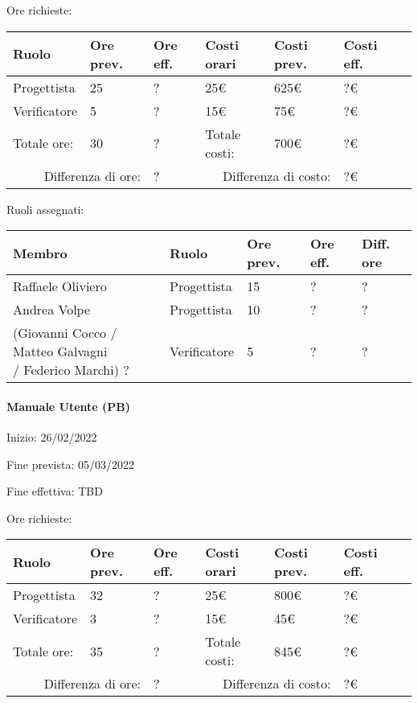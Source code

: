 \documentclass[a4paper, 12pt]{article}
\begin{document}
Ore richieste:\\[0.5em]
\begin{tabular}{|l|l|l||l|l|l|l|}\hline
Ruolo & Ore prev. & Ore eff. & Costi orari & Costi prev. & Costi eff.\\\hline
Progettista & 25 & ? & 25\euro & 625\euro & ?\euro \\\hline
Verificatore & 5 & ? & 15\euro & 75\euro & ?\euro \\\hline
Totale ore: & 30 & ? & Totale costi: & 700\euro & ?\euro \\\hline
\multicolumn{2}{|r|}{Differenza di ore:} & ? & \multicolumn{2}{r|}{Differenza di costo:} & ?\euro \\\hline
\end{tabular}

Ruoli assegnati:\\[0.5em]
\begin{tabular}{|l|l|l|l|l|}\hline
Membro & Ruolo & Ore prev. & Ore eff. & Diff. ore \\\hline
Raffaele Oliviero & Progettista & 15 & ? & ? \\\hline
Andrea Volpe & Progettista & 10 & ? & ? \\\hline
\pbox{20cm}{(Giovanni Cocco / Matteo Galvagni\\ / Federico Marchi) ?} & Verificatore & 5 & ? & ? \\\hline
\end{tabular}

\paragraph{Manuale Utente (PB)}
Inizio: 26/02/2022\par
Fine prevista: 05/03/2022\par
Fine effettiva: TBD

Ore richieste:\\[0.5em]
\begin{tabular}{|l|l|l||l|l|l|l|}\hline
Ruolo & Ore prev. & Ore eff. & Costi orari & Costi prev. & Costi eff.\\\hline
Progettista & 32 & ? & 25\euro & 800\euro & ?\euro \\\hline
Verificatore & 3 & ? & 15\euro & 45\euro & ?\euro \\\hline
Totale ore: & 35 & ? & Totale costi: & 845\euro & ?\euro \\\hline
\multicolumn{2}{|r|}{Differenza di ore:} & ? & \multicolumn{2}{r|}{Differenza di costo:} & ?\euro \\\hline
\end{tabular}
\end{document}
